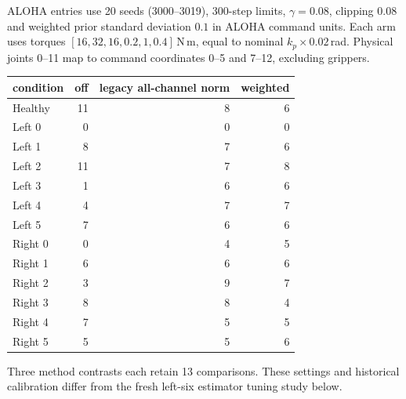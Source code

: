 \documentclass{article}
\begin{document}
ALOHA entries use 20 seeds (3000--3019), 300-step limits, $\gamma=0.08$, clipping $0.08$
and weighted prior standard deviation $0.1$ in ALOHA command units. Each arm uses torques
$[16,32,16,0.2,1,0.4]$\,N\,m, equal to nominal $k_p\times0.02$\,rad.
Physical joints 0--11 map to command coordinates 0--5 and 7--12, excluding grippers.
\begin{center}\small
\begin{tabular}{lrrr}
\toprule
condition & off & legacy all-channel norm & weighted \\
\midrule
Healthy & 11 & 8 & 6 \\
Left 0 & 0 & 0 & 0 \\
Left 1 & 8 & 7 & 6 \\
Left 2 & 11 & 7 & 8 \\
Left 3 & 1 & 6 & 6 \\
Left 4 & 4 & 7 & 7 \\
Left 5 & 7 & 6 & 6 \\
Right 0 & 0 & 4 & 5 \\
Right 1 & 6 & 6 & 6 \\
Right 2 & 3 & 9 & 7 \\
Right 3 & 8 & 8 & 4 \\
Right 4 & 7 & 5 & 5 \\
Right 5 & 5 & 5 & 6 \\
\bottomrule
\end{tabular}
\end{center}
Three method contrasts each retain 13 comparisons. These settings and historical
calibration differ from the fresh left-six estimator tuning study below.
\end{document}
